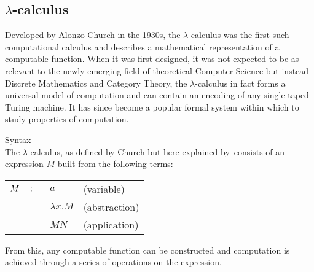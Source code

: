\subsection{\texorpdfstring{$\lambda$-c}{Lambda C}alculus}\label{ssec:lambda-calculus}

    Developed by Alonzo Church in the 1930s, the $\lambda$-calculus was the first such computational calculus and describes a mathematical representation of a computable function.
    When it was first designed, it was not expected to be as relevant to the newly-emerging field of theoretical Computer Science but instead Discrete Mathematics and Category Theory, the $\lambda$-calculus in fact forms a universal model of computation and can contain an encoding of any single-taped Turing machine.
    It has since become a popular formal system within which to study properties of computation.


    \begin{definition}{Syntax\\}
        \label{lambda-calculus-syntax}
        The $\lambda$-calculus, as defined by Church but here explained by~\cite{lambda-calculus}\footnotemark consists of an expression $M$ built from the following terms:
        \begin{center}
            \begin{tabular}{ l l l }
                $M  \quad :=$       & $a$               & (variable) \\
                                        & $\lambda x . M$   & (abstraction) \\
                                        & $M N$             & (application)
            \end{tabular}
        \end{center}
    \end{definition}
    From this, any computable function can be constructed and computation is achieved through a series of operations on the expression.


